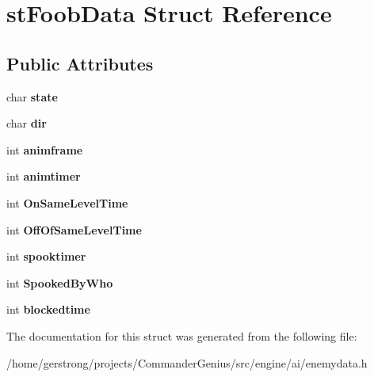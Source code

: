 \hypertarget{structst_foob_data}{
\section{stFoobData Struct Reference}
\label{structst_foob_data}
}
\subsection*{Public Attributes}
\begin{DoxyCompactItemize}
\item 
\hypertarget{structst_foob_data_a562db2815178f590460b66b8b4e6e352}{
char {\bfseries state}}
\label{structst_foob_data_a562db2815178f590460b66b8b4e6e352}

\item 
\hypertarget{structst_foob_data_a1fa349319ff1cdd7f7791ac5c9195e7b}{
char {\bfseries dir}}
\label{structst_foob_data_a1fa349319ff1cdd7f7791ac5c9195e7b}

\item 
\hypertarget{structst_foob_data_af77393325db65b239a98b74854ef6b28}{
int {\bfseries animframe}}
\label{structst_foob_data_af77393325db65b239a98b74854ef6b28}

\item 
\hypertarget{structst_foob_data_a8cead4f154133d4282aea5c6102a545d}{
int {\bfseries animtimer}}
\label{structst_foob_data_a8cead4f154133d4282aea5c6102a545d}

\item 
\hypertarget{structst_foob_data_af93dc4281dba675f7e8e5b7a8f1c064b}{
int {\bfseries OnSameLevelTime}}
\label{structst_foob_data_af93dc4281dba675f7e8e5b7a8f1c064b}

\item 
\hypertarget{structst_foob_data_af7c40fc8d2e763d7021b21688b4c0d38}{
int {\bfseries OffOfSameLevelTime}}
\label{structst_foob_data_af7c40fc8d2e763d7021b21688b4c0d38}

\item 
\hypertarget{structst_foob_data_a065a2668430b8793d87107acd821a768}{
int {\bfseries spooktimer}}
\label{structst_foob_data_a065a2668430b8793d87107acd821a768}

\item 
\hypertarget{structst_foob_data_a540ef2dc7b491588969772923c7f141d}{
int {\bfseries SpookedByWho}}
\label{structst_foob_data_a540ef2dc7b491588969772923c7f141d}

\item 
\hypertarget{structst_foob_data_a284e69d18d4316c45f18be96fb21484b}{
int {\bfseries blockedtime}}
\label{structst_foob_data_a284e69d18d4316c45f18be96fb21484b}

\end{DoxyCompactItemize}


The documentation for this struct was generated from the following file:\begin{DoxyCompactItemize}
\item 
/home/gerstrong/projects/CommanderGenius/src/engine/ai/enemydata.h\end{DoxyCompactItemize}
